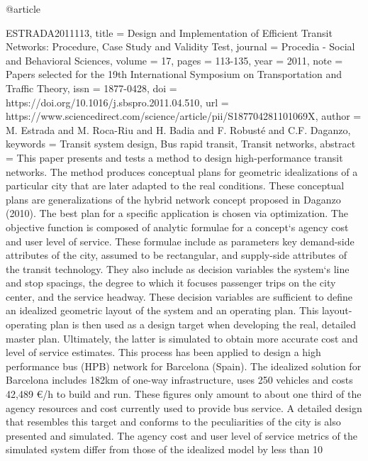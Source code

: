 @article{ESTRADA2011113,
title = {Design and Implementation of Efficient Transit Networks: Procedure, Case Study and Validity Test},
journal = {Procedia - Social and Behavioral Sciences},
volume = {17},
pages = {113-135},
year = {2011},
note = {Papers selected for the 19th International Symposium on Transportation and Traffic Theory},
issn = {1877-0428},
doi = {https://doi.org/10.1016/j.sbspro.2011.04.510},
url = {https://www.sciencedirect.com/science/article/pii/S187704281101069X},
author = {M. Estrada and M. Roca-Riu and H. Badia and F. Robusté and C.F. Daganzo},
keywords = {Transit system design, Bus rapid transit, Transit networks},
abstract = {This paper presents and tests a method to design high-performance transit networks. The method produces conceptual plans for geometric idealizations of a particular city that are later adapted to the real conditions. These conceptual plans are generalizations of the hybrid network concept proposed in Daganzo (2010). The best plan for a specific application is chosen via optimization. The objective function is composed of analytic formulae for a concept‘s agency cost and user level of service. These formulae include as parameters key demand-side attributes of the city, assumed to be rectangular, and supply-side attributes of the transit technology. They also include as decision variables the system‘s line and stop spacings, the degree to which it focuses passenger trips on the city center, and the service headway. These decision variables are sufficient to define an idealized geometric layout of the system and an operating plan. This layout-operating plan is then used as a design target when developing the real, detailed master plan. Ultimately, the latter is simulated to obtain more accurate cost and level of service estimates. This process has been applied to design a high performance bus (HPB) network for Barcelona (Spain). The idealized solution for Barcelona includes 182km of one-way infrastructure, uses 250 vehicles and costs 42,489 €/h to build and run. These figures only amount to about one third of the agency resources and cost currently used to provide bus service. A detailed design that resembles this target and conforms to the peculiarities of the city is also presented and simulated. The agency cost and user level of service metrics of the simulated system differ from those of the idealized model by less than 10%
}



}
